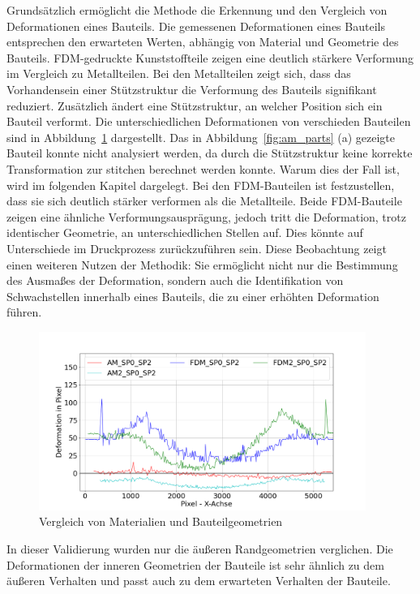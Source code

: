 Grundsätzlich ermöglicht die Methode die Erkennung und den Vergleich von Deformationen 
eines Bauteils. Die gemessenen Deformationen eines Bauteils entsprechen den erwarteten Werten, 
abhängig von Material und Geometrie des Bauteils. FDM-gedruckte Kunststoffteile zeigen 
eine deutlich stärkere Verformung im Vergleich zu Metallteilen.
Bei den Metallteilen zeigt sich, dass das Vorhandensein einer Stützstruktur die
Verformung des Bauteils signifikant reduziert. Zusätzlich ändert eine Stützstruktur, an 
welcher Position sich ein Bauteil verformt.
Die unterschiedlichen Deformationen von verschieden Bauteilen sind in 
Abbildung~\ref{fig:materials} dargestellt. 
Das in Abbildung~\ref{fig:am_parts} (a) gezeigte Bauteil konnte nicht analysiert werden, 
da durch die Stützstruktur keine korrekte Transformation zur stitchen berechnet werden konnte.
Warum dies der Fall ist, wird im folgenden Kapitel dargelegt.
Bei den FDM-Bauteilen ist festzustellen, dass sie sich deutlich stärker verformen 
als die Metallteile. Beide FDM-Bauteile zeigen eine ähnliche Verformungsausprägung, 
jedoch tritt die Deformation, trotz identischer Geometrie, an unterschiedlichen Stellen auf. 
Dies könnte auf Unterschiede im Druckprozess zurückzuführen sein. 
Diese Beobachtung zeigt einen weiteren Nutzen der Methodik: Sie ermöglicht
nicht nur die Bestimmung des Ausmaßes der Deformation, sondern auch die 
Identifikation von Schwachstellen innerhalb eines Bauteils, die zu einer erhöhten 
Deformation führen.

\begin{figure}[H]
  \centering
  \includegraphics[width=0.95\textwidth]{images/compare_materials.png}
  \caption{Vergleich von Materialien und Bauteilgeometrien}
  \label{fig:materials}
\end{figure}

In dieser Validierung wurden nur 
die äußeren Randgeometrien verglichen. Die Deformationen der inneren 
Geometrien der Bauteile ist sehr ähnlich zu dem äußeren Verhalten und passt 
auch zu dem erwarteten Verhalten der Bauteile.

